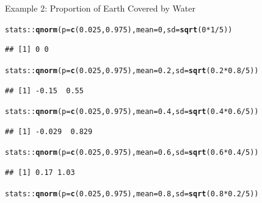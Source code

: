 \documentclass[10pt,handout]{beamer}\usepackage[]{graphicx}\usepackage[]{color}
\makeatletter
\newcommand{\hlnum}[1]{\textcolor[rgb]{0.686,0.059,0.569}{#1}}%
\newcommand{\hlopt}[1]{\textcolor[rgb]{0,0,0}{#1}}%
\newcommand{\hlstd}[1]{\textcolor[rgb]{0.345,0.345,0.345}{#1}}%
\newcommand{\hlkwc}[1]{\textcolor[rgb]{0.333,0.667,0.333}{#1}}%
\newcommand{\hlkwd}[1]{\textcolor[rgb]{0.737,0.353,0.396}{\textbf{#1}}}%
\newenvironment{kframe}{%
 \def\at@end@of@kframe{}%
 \ifinner\ifhmode%
  \def\at@end@of@kframe{\end{minipage}}%
  \begin{minipage}{\columnwidth}%
 \fi\fi%
 \def\FrameCommand##1{\hskip\@totalleftmargin \hskip-\fboxsep
 \colorbox{shadecolor}{##1}\hskip-\fboxsep
     \hskip-\linewidth \hskip-\@totalleftmargin \hskip\columnwidth}%
 \MakeFramed {\advance\hsize-\width
   \@totalleftmargin\z@ \linewidth\hsize
   \@setminipage}}%
 {\par\unskip\endMakeFramed%
 \at@end@of@kframe}
\newenvironment{knitrout}{}{} %
\makeatother
\begin{document}
\begin{frame}[fragile]{Example 2: Proportion of Earth Covered by Water}
	
\begin{knitrout}\tiny
{}\color{fgcolor}\begin{kframe}
\begin{alltt}
\hlstd{stats}\hlopt{::}\hlkwd{qnorm}\hlstd{(}\hlkwc{p}\hlstd{=}\hlkwd{c}\hlstd{(}\hlnum{0.025}\hlstd{,}\hlnum{0.975}\hlstd{),} \hlkwc{mean} \hlstd{=} \hlnum{0}\hlstd{,} \hlkwc{sd} \hlstd{=} \hlkwd{sqrt}\hlstd{(}\hlnum{0} \hlopt{*} \hlnum{1} \hlopt{/} \hlnum{5}\hlstd{))}
\end{alltt}
\begin{verbatim}
## [1] 0 0
\end{verbatim}
\begin{alltt}
\hlstd{stats}\hlopt{::}\hlkwd{qnorm}\hlstd{(}\hlkwc{p}\hlstd{=}\hlkwd{c}\hlstd{(}\hlnum{0.025}\hlstd{,}\hlnum{0.975}\hlstd{),} \hlkwc{mean} \hlstd{=} \hlnum{0.2}\hlstd{,} \hlkwc{sd} \hlstd{=} \hlkwd{sqrt}\hlstd{(}\hlnum{0.2} \hlopt{*} \hlnum{0.8} \hlopt{/} \hlnum{5}\hlstd{))}
\end{alltt}
\begin{verbatim}
## [1] -0.15  0.55
\end{verbatim}
\begin{alltt}
\hlstd{stats}\hlopt{::}\hlkwd{qnorm}\hlstd{(}\hlkwc{p}\hlstd{=}\hlkwd{c}\hlstd{(}\hlnum{0.025}\hlstd{,}\hlnum{0.975}\hlstd{),} \hlkwc{mean} \hlstd{=} \hlnum{0.4}\hlstd{,} \hlkwc{sd} \hlstd{=} \hlkwd{sqrt}\hlstd{(}\hlnum{0.4} \hlopt{*} \hlnum{0.6} \hlopt{/} \hlnum{5}\hlstd{))}
\end{alltt}
\begin{verbatim}
## [1] -0.029  0.829
\end{verbatim}
\begin{alltt}
\hlstd{stats}\hlopt{::}\hlkwd{qnorm}\hlstd{(}\hlkwc{p}\hlstd{=}\hlkwd{c}\hlstd{(}\hlnum{0.025}\hlstd{,}\hlnum{0.975}\hlstd{),} \hlkwc{mean} \hlstd{=} \hlnum{0.6}\hlstd{,} \hlkwc{sd} \hlstd{=} \hlkwd{sqrt}\hlstd{(}\hlnum{0.6} \hlopt{*} \hlnum{0.4} \hlopt{/} \hlnum{5}\hlstd{))}
\end{alltt}
\begin{verbatim}
## [1] 0.17 1.03
\end{verbatim}
\begin{alltt}
\hlstd{stats}\hlopt{::}\hlkwd{qnorm}\hlstd{(}\hlkwc{p}\hlstd{=}\hlkwd{c}\hlstd{(}\hlnum{0.025}\hlstd{,}\hlnum{0.975}\hlstd{),} \hlkwc{mean} \hlstd{=} \hlnum{0.8}\hlstd{,} \hlkwc{sd} \hlstd{=} \hlkwd{sqrt}\hlstd{(}\hlnum{0.8} \hlopt{*} \hlnum{0.2} \hlopt{/} \hlnum{5}\hlstd{))}

\end{alltt}
\end{kframe}
\end{knitrout}
\end{frame}
\end{document}
